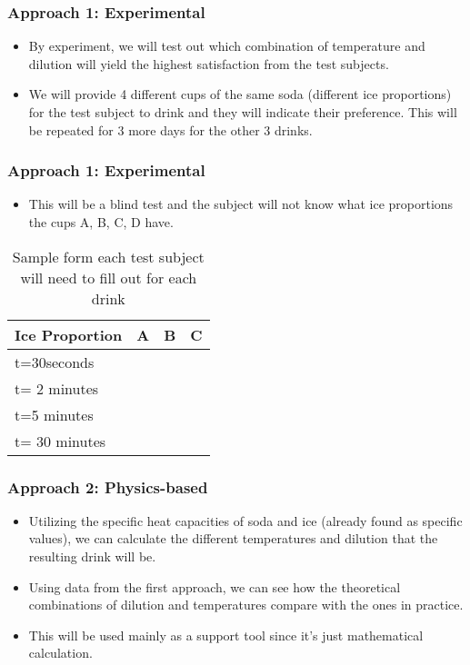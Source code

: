\documentclass[compress,handout,10pt]{beamer}
\let\olditem\item
\renewcommand{\item}{\setlength{\itemsep}{0.5\baselineskip}\olditem}
\begin{document}
\begin{frame}
    \frametitle{Approach 1: Experimental}

\begin {itemize}
\item By experiment, we will test out which combination of temperature and dilution will yield the highest satisfaction from the test subjects.
\item We will provide 4 different cups of the same soda (different ice proportions) for the test subject to drink and they will indicate their preference. This will be repeated for 3 more days for the other 3 drinks.
\end{itemize}
\end{frame}

\begin{frame}
    \frametitle{Approach 1: Experimental}

\begin {itemize}

\item This will be a blind test and the subject will not know what ice proportions the cups A, B, C, D have.
\end{itemize}
\vspace{6pt}

\begin{table}[ h]
\centering
\begin{tabular}{ l | c|c|c }
  Ice Proportion & A  & B & C  \\
\hline  
t=30seconds & & &\\ 
\hline  
t= 2 minutes & & &\\ 
\hline  
t=5 minutes  & & &\\ 
\hline  
t= 30 minutes & & &\\ 
\hline  
   
 \end{tabular}
\caption{Sample form each test subject will need to fill out for each drink}

\end{table}

\end{frame}

\begin{frame}
    \frametitle{Approach 2: Physics-based}

\begin {itemize}
\item Utilizing the specific heat capacities of soda and ice (already found as specific values), we can calculate the different temperatures and dilution that the resulting drink will be.
\item Using data from the first approach, we can see how the theoretical combinations of dilution and temperatures compare with the ones in practice.
\item This will be used mainly as a support tool since it's just mathematical calculation.
\end{itemize}

\end{frame}
 
\end{document}
